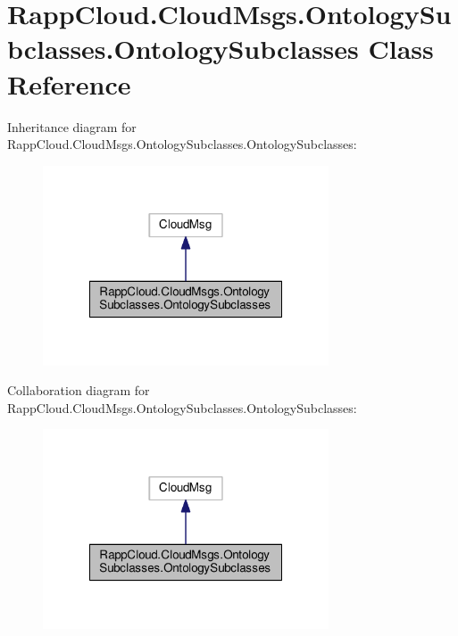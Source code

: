 \hypertarget{classRappCloud_1_1CloudMsgs_1_1OntologySubclasses_1_1OntologySubclasses}{\section{Rapp\-Cloud.\-Cloud\-Msgs.\-Ontology\-Subclasses.\-Ontology\-Subclasses Class Reference}
\label{classRappCloud_1_1CloudMsgs_1_1OntologySubclasses_1_1OntologySubclasses}
}


Inheritance diagram for Rapp\-Cloud.\-Cloud\-Msgs.\-Ontology\-Subclasses.\-Ontology\-Subclasses\-:
\nopagebreak
\begin{figure}[H]
\begin{center}
\leavevmode
\includegraphics[width=240pt]{classRappCloud_1_1CloudMsgs_1_1OntologySubclasses_1_1OntologySubclasses__inherit__graph}
\end{center}
\end{figure}


Collaboration diagram for Rapp\-Cloud.\-Cloud\-Msgs.\-Ontology\-Subclasses.\-Ontology\-Subclasses\-:
\nopagebreak
\begin{figure}[H]
\begin{center}
\leavevmode
\includegraphics[width=240pt]{classRappCloud_1_1CloudMsgs_1_1OntologySubclasses_1_1OntologySubclasses__coll__graph}
\end{center}
\end{figure}
